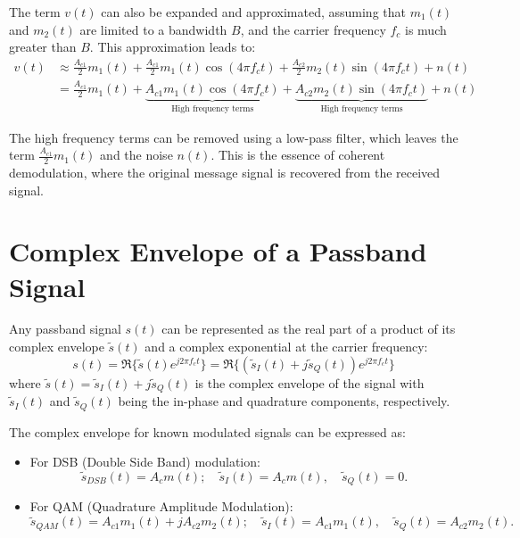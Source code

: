 The term \( v(t) \) can also be expanded and approximated, assuming that \( m_1(t) \) and \( m_2(t) \) are limited to a bandwidth \( B \), and the carrier frequency \( f_c \) is much greater than \( B \). This approximation leads to:
\begin{align}
    v(t) & \approx \frac{A_{c1}}{2} m_1(t) + \frac{A_{c1}}{2} m_1(t) \cos(4\pi f_c t) + \frac{A_{c2}}{2} m_2(t) \sin(4\pi f_c t) + n(t) \\
    & = \frac{A_{c1}}{2} m_1(t) + \underbrace{A_{c1} m_1(t) \cos(4\pi f_c t)}_{\text{High frequency terms}} + \underbrace{A_{c2} m_2(t) \sin(4\pi f_c t)}_{\text{High frequency terms}} + n(t)
\end{align}

The high frequency terms can be removed using a low-pass filter, which leaves the term \( \frac{A_{c1}}{2} m_1(t) \) and the noise \( n(t) \). This is the essence of coherent demodulation, where the original message signal is recovered from the received signal.


\section*{Complex Envelope of a Passband Signal}

Any passband signal \( s(t) \) can be represented as the real part of a product of its complex envelope \( \tilde{s}(t) \) and a complex exponential at the carrier frequency:
\begin{equation}
    s(t) = \Re\{\tilde{s}(t) e^{j2\pi f_c t}\} = \Re\{(\tilde{s}_I(t) + j\tilde{s}_Q(t))e^{j2\pi f_c t}\}
\end{equation}
where \( \tilde{s}(t) = \tilde{s}_I(t) + j\tilde{s}_Q(t) \) is the complex envelope of the signal with \( \tilde{s}_I(t) \) and \( \tilde{s}_Q(t) \) being the in-phase and quadrature components, respectively.

The complex envelope for known modulated signals can be expressed as:
\begin{itemize}
    \item For DSB (Double Side Band) modulation:
    \begin{equation}
        \tilde{s}_{DSB}(t) = A_c m(t); \quad \tilde{s}_I(t) = A_c m(t), \quad \tilde{s}_Q(t) = 0.
    \end{equation}
    \item For QAM (Quadrature Amplitude Modulation):
    \begin{equation}
        \tilde{s}_{QAM}(t) = A_{c1}m_1(t) + jA_{c2}m_2(t); \quad \tilde{s}_I(t) = A_{c1}m_1(t), \quad \tilde{s}_Q(t) = A_{c2}m_2(t).
    \end{equation}
\end{itemize}

